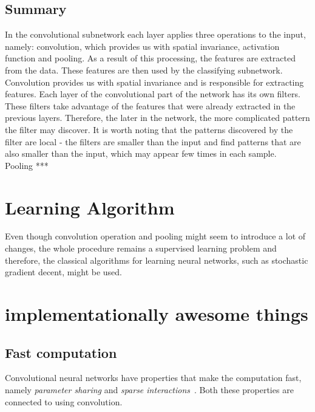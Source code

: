 \documentclass[a4paper,10pt]{report}
\begin{document}
	  
	\subsection{Summary}
	  In the convolutional subnetwork each layer applies three operations to the input, namely: convolution, which provides us with spatial invariance, activation function and pooling. As a result of this processing, the features are extracted from the data. These features are then used by the classifying subnetwork.\\
	  
	  Convolution provides us with spatial invariance and is responsible for extracting features. Each layer of the convolutional part of the network has its own filters. These filters take advantage of the features that were already extracted in the previous layers. Therefore, the later in the network, the more complicated pattern the filter may discover. It is worth noting that the patterns discovered by the filter are local - the filters are smaller than the input and find patterns that are also smaller than the input, which may appear few times in each sample.\\
	  
	  Pooling ***
	  
	  	  
      
      
      \section{Learning Algorithm}
      Even though convolution operation and pooling might seem to introduce a lot of changes, the whole procedure remains a supervised learning problem and therefore, the classical algorithms for learning neural networks, such as stochastic gradient decent, might be used.
      
       \section{implementationally awesome things} %
      
	\subsection{Fast computation}
	  Convolutional neural networks have properties that make the computation fast, namely \emph{parameter sharing} and \emph{sparse interactions}~\cite{BENGIOBOOK}. Both these properties are connected to using convolution.\\
	  
\end{document}
